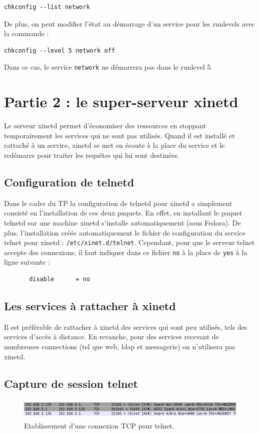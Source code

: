 \documentclass[12pt,a4paper,notitlepage]{article}
\begin{document}
\begin{lstlisting}
chkconfig --list network
\end{lstlisting}
De plus, on peut modifier l'état au démarrage d'un service pour les runlevels avec la commande :
\begin{lstlisting}
chkconfig --level 5 network off
\end{lstlisting}
Dans ce cas, le service \texttt{network} ne démarrera pas dans le runlevel 5.


\section{Partie 2 : le super-serveur xinetd}
Le serveur xinetd permet d'économiser des ressources en stoppant temporairement les services qui ne sont pas utilisés. Quand il est installé et rattaché à un service, xinetd se met en écoute à la place du service et le redémarre pour traiter les requêtes qui lui sont destinées.
\subsection{Configuration de telnetd}
 
Dans le cadre du TP la configuration de telnetd pour xinetd a simplement consisté en l'installation de ces deux paquets. En effet, en installant le paquet telnetd sur une machine xinetd s'installe automatiquement (sous Fedora). De plus, l'installation créée automatiquement le fichier de configuration du service telnet pour xinetd : \texttt{/etc/xinet.d/telnet}. Cependant, pour que le serveur telnet accepte des connexions, il faut indiquer dans ce fichier \texttt{no} à la place de \texttt{yes} à la ligne suivante :
\begin{lstlisting}
       disable		= no
\end{lstlisting}

\subsection{Les services à rattacher à xinetd}
Il est préférable de rattacher à xinetd des services qui sont peu utilisés, tels des services d'accès à distance. En revanche, pour des services recevant de nombreuses connections (tel que web, ldap et messagerie) on n'utilisera pas xinetd.

\subsection{Capture de session telnet}
\begin{figure}[!h]
\begin{center}
\includegraphics[height=1cm]{syn_ack.png}
\caption{Etablissement d'une connexion TCP pour telnet.}
\label{fig:da}
\end{center}
\end{figure}
\end{document}

